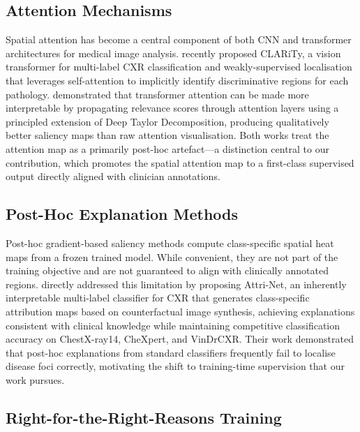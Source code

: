 \documentclass[12pt, a4paper]{article}
\begin{document}
\subsection{Attention Mechanisms}

Spatial attention has become a central component of both CNN and transformer architectures
for medical image analysis. \citet{clarity2025} recently proposed CLARiTy, a vision
transformer for multi-label CXR classification and weakly-supervised localisation that
leverages self-attention to implicitly identify discriminative regions for each pathology.
\citet{chefer2021} demonstrated that transformer attention can be made more interpretable
by propagating relevance scores through attention layers using a principled extension of
Deep Taylor Decomposition, producing qualitatively better saliency maps than raw attention
visualisation. Both works treat the attention map as a primarily post-hoc artefact---a
distinction central to our contribution, which promotes the spatial attention map to a
first-class supervised output directly aligned with clinician annotations.

\subsection{Post-Hoc Explanation Methods}

Post-hoc gradient-based saliency methods compute class-specific spatial heat maps from
a frozen trained model. While convenient, they are not part of the training objective and
are not guaranteed to align with clinically annotated regions.
\citet{attrinet2023} directly addressed this limitation by proposing Attri-Net, an
inherently interpretable multi-label classifier for CXR that generates class-specific
attribution maps based on counterfactual image synthesis, achieving explanations
consistent with clinical knowledge while maintaining competitive classification accuracy
on ChestX-ray14, CheXpert, and VinDrCXR. Their work demonstrated that post-hoc
explanations from standard classifiers frequently fail to localise disease foci correctly,
motivating the shift to training-time supervision that our work pursues.

\subsection{Right-for-the-Right-Reasons Training}
\end{document}
